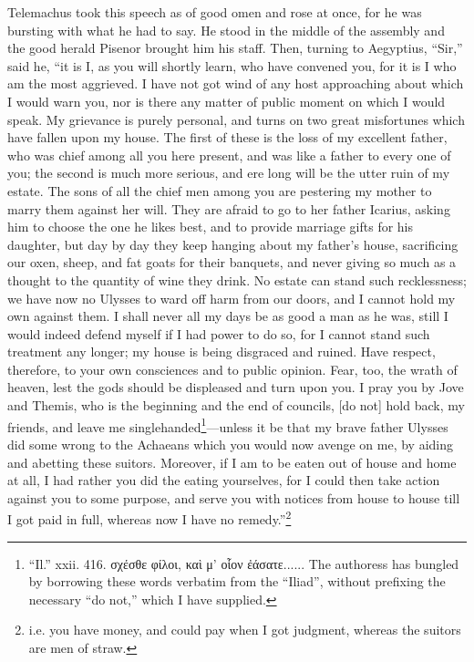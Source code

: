 Telemachus took this speech as of good omen and rose at once, for he was
bursting with what he had to say. He stood in the middle of the assembly and
the good herald Pisenor brought him his staff. Then, turning to Aegyptius,
“Sir,” said he, “it is I, as you will shortly learn, who have convened you, for
it is I who am the most aggrieved. I have not got wind of any host approaching
about which I would warn you, nor is there any matter of public moment on which
I would speak. My grievance is purely personal, and turns on two great
misfortunes which have fallen upon my house. The first of these is the loss of
my excellent father, who was chief among all you here present, and was like a
father to every one of you; the second is much more serious, and ere long will
be the utter ruin of my estate. The sons of all the chief men among you are
pestering my mother to marry them against her will. They are afraid to go to
her father Icarius, asking him to choose the one he likes best, and to provide
marriage gifts for his daughter, but day by day they keep hanging about my
father’s house, sacrificing our oxen, sheep, and fat goats for their banquets,
and never giving so much as a thought to the quantity of wine they drink. No
estate can stand such recklessness; we have now no Ulysses to ward off harm
from our doors, and I cannot hold my own against them. I shall never all my
days be as good a man as he was, still I would indeed defend myself if I had
power to do so, for I cannot stand such treatment any longer; my house is being
disgraced and ruined. Have respect, therefore, to your own consciences and to
public opinion. Fear, too, the wrath of heaven, lest the gods should be
displeased and turn upon you. I pray you by Jove and Themis, who is the
beginning and the end of councils, [do not] hold back, my friends, and leave me
singlehanded\footnote{“Il.” xxii. 416. σχέσθε
φίλοι, καὶ μ’
οἷον ἐάσατε...... The
authoress has bungled by borrowing these words verbatim from the “Iliad”,
without prefixing the necessary “do not,” which I have supplied.}—unless it be that my brave father
Ulysses did some wrong to the Achaeans which you would now avenge on me, by
aiding and abetting these suitors. Moreover, if I am to be eaten out of house
and home at all, I had rather you did the eating yourselves, for I could then
take action against you to some purpose, and serve you with notices from house
to house till I got paid in full, whereas now I have no remedy.”\footnote{i.e. you have money, and could pay when I got judgment, whereas the suitors
are men of straw.}

